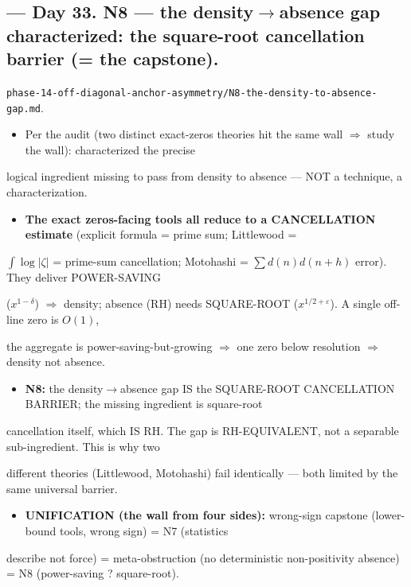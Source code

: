 \documentclass[10pt]{article}
\begin{document}
\subsection*{ --- Day 33. N8 --- the density\ensuremath{\to}absence gap characterized: the square-root cancellation barrier (= the capstone).}
\texttt{phase-14-off-diagonal-anchor-asymmetry/N8-the-density-to-absence-gap.md}.\par
\begin{itemize}
\item Per the audit (two distinct exact-zeros theories hit the same wall \ensuremath{\Rightarrow} study the wall): characterized the precise
\end{itemize}
  logical ingredient missing to pass from density to absence --- NOT a technique, a characterization.\par
\begin{itemize}
\item \textbf{The exact zeros-facing tools all reduce to a CANCELLATION estimate} (explicit formula = prime sum; Littlewood =
\end{itemize}
  $\int\log|\zeta|$ = prime-sum cancellation; Motohashi = $\sum d(n)d(n+h)$ error). They deliver POWER-SAVING\par
  ($x^{1-\delta}$) \ensuremath{\Rightarrow} density; absence (RH) needs SQUARE-ROOT ($x^{1/2+\varepsilon}$). A single off-line zero is $O(1)$,\par
  the aggregate is power-saving-but-growing \ensuremath{\Rightarrow} one zero below resolution \ensuremath{\Rightarrow} density not absence.\par
\begin{itemize}
\item \textbf{N8:} the density\ensuremath{\to}absence gap IS the SQUARE-ROOT CANCELLATION BARRIER; the missing ingredient is square-root
\end{itemize}
  cancellation itself, which IS RH. The gap is RH-EQUIVALENT, not a separable sub-ingredient. This is why two\par
  different theories (Littlewood, Motohashi) fail identically --- both limited by the same universal barrier.\par
\begin{itemize}
\item \textbf{UNIFICATION (the wall from four sides):} wrong-sign capstone (lower-bound tools, wrong sign) = N7 (statistics
\end{itemize}
  describe not force) = meta-obstruction (no deterministic non-positivity absence) = N8 (power-saving ? square-root).\par
\end{document}
